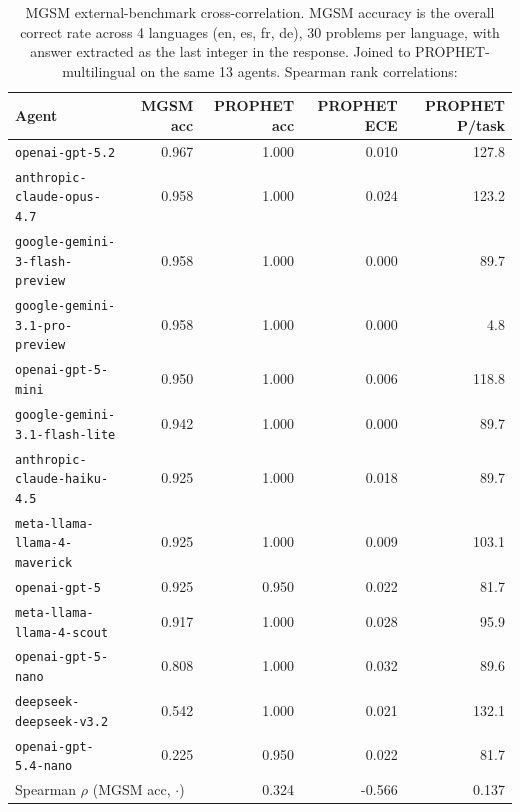 \begin{table}[t]\centering\small
\caption{MGSM external-benchmark cross-correlation. MGSM accuracy is the overall correct rate across 4 languages (en, es, fr, de), 30 problems per language, with answer extracted as the last integer in the response. Joined to PROPHET-multilingual on the same 13 agents. Spearman rank correlations:}
\label{tab:mgsm-correlation}
\begin{tabular}{lrrrr}
\toprule
Agent & MGSM acc & PROPHET acc & PROPHET ECE & PROPHET P/task \\
\midrule
\texttt{openai-gpt-5.2} & 0.967 & 1.000 & 0.010 & 127.8 \\
\texttt{anthropic-claude-opus-4.7} & 0.958 & 1.000 & 0.024 & 123.2 \\
\texttt{google-gemini-3-flash-preview} & 0.958 & 1.000 & 0.000 & 89.7 \\
\texttt{google-gemini-3.1-pro-preview} & 0.958 & 1.000 & 0.000 & 4.8 \\
\texttt{openai-gpt-5-mini} & 0.950 & 1.000 & 0.006 & 118.8 \\
\texttt{google-gemini-3.1-flash-lite} & 0.942 & 1.000 & 0.000 & 89.7 \\
\texttt{anthropic-claude-haiku-4.5} & 0.925 & 1.000 & 0.018 & 89.7 \\
\texttt{meta-llama-llama-4-maverick} & 0.925 & 1.000 & 0.009 & 103.1 \\
\texttt{openai-gpt-5} & 0.925 & 0.950 & 0.022 & 81.7 \\
\texttt{meta-llama-llama-4-scout} & 0.917 & 1.000 & 0.028 & 95.9 \\
\texttt{openai-gpt-5-nano} & 0.808 & 1.000 & 0.032 & 89.6 \\
\texttt{deepseek-deepseek-v3.2} & 0.542 & 1.000 & 0.021 & 132.1 \\
\texttt{openai-gpt-5.4-nano} & 0.225 & 0.950 & 0.022 & 81.7 \\
\midrule
\multicolumn{2}{l}{Spearman $\rho$ (MGSM acc, $\cdot$)} & 0.324 & -0.566 & 0.137 \\
\bottomrule
\end{tabular}\end{table}